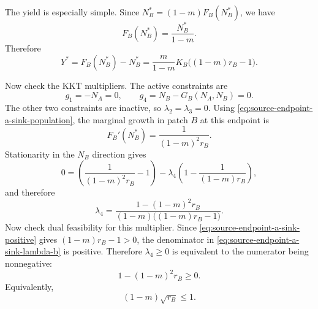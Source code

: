 \documentclass{article}
\numberwithin{equation}{section}
\begin{document}
The yield is especially simple. Since
$N_B^*=(1-m)F_B(N_B^*)$, we have
\begin{equation*}
    F_B(N_B^*)=\frac{N_B^*}{1-m}.
\end{equation*}
Therefore
\begin{equation}
    \label{eq:source-endpoint-a-sink-yield}
    Y^*
    =
    F_B(N_B^*)-N_B^*
    =
    \frac{m}{1-m}
    K_B\bigl((1-m)r_B-1\bigr).
\end{equation}

Now check the KKT multipliers. The active constraints are
\begin{equation*}
    g_1=-N_A=0,
    \qquad
    g_4=N_B-G_B(N_A,N_B)=0.
\end{equation*}
The other two constraints are inactive, so
$\lambda_2=\lambda_3=0$. Using
\eqref{eq:source-endpoint-a-sink-population}, the marginal growth in
patch $B$ at this endpoint is
\begin{equation}
    \label{eq:source-endpoint-a-sink-derivative-b}
    F_B'(N_B^*)
    =
    \frac{1}{(1-m)^2r_B}.
\end{equation}
Stationarity in the $N_B$ direction gives
\begin{equation*}
    0
    =
    \left(\frac{1}{(1-m)^2r_B}-1\right)
    -
    \lambda_4
    \left(1-\frac{1}{(1-m)r_B}\right),
\end{equation*}
and therefore
\begin{equation}
    \label{eq:source-endpoint-a-sink-lambda-b}
    \lambda_4
    =
    \frac{1-(1-m)^2r_B}
         {(1-m)\bigl((1-m)r_B-1\bigr)}.
\end{equation}
Now check dual feasibility for this multiplier. Since
\eqref{eq:source-endpoint-a-sink-positive} gives
$(1-m)r_B-1>0$, the denominator in
\eqref{eq:source-endpoint-a-sink-lambda-b} is positive. Therefore
$\lambda_4\geq0$ is equivalent to the numerator being nonnegative:
\begin{equation*}
    1-(1-m)^2r_B\geq0.
\end{equation*}
Equivalently,
\begin{equation}
    \label{eq:source-endpoint-a-sink-lambda-b-condition}
    (1-m)\sqrt{r_B}\leq1.
\end{equation}
\end{document}
